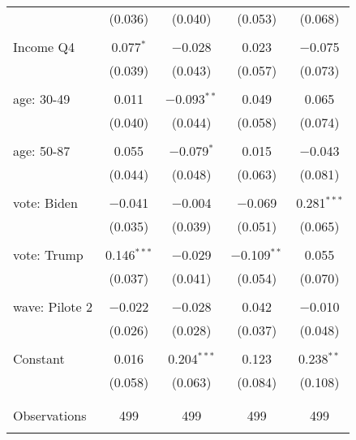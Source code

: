 \begin{tabular}{@{\extracolsep{5pt}}lcccc}
  & (0.036) & (0.040) & (0.053) & (0.068) \\ 
  & & & & \\ 
 Income Q4 & 0.077$^{*}$ & $-$0.028 & 0.023 & $-$0.075 \\ 
  & (0.039) & (0.043) & (0.057) & (0.073) \\ 
  & & & & \\ 
 age: 30-49 & 0.011 & $-$0.093$^{**}$ & 0.049 & 0.065 \\ 
  & (0.040) & (0.044) & (0.058) & (0.074) \\ 
  & & & & \\ 
 age: 50-87 & 0.055 & $-$0.079$^{*}$ & 0.015 & $-$0.043 \\ 
  & (0.044) & (0.048) & (0.063) & (0.081) \\ 
  & & & & \\ 
 vote: Biden & $-$0.041 & $-$0.004 & $-$0.069 & 0.281$^{***}$ \\ 
  & (0.035) & (0.039) & (0.051) & (0.065) \\ 
  & & & & \\ 
 vote: Trump & 0.146$^{***}$ & $-$0.029 & $-$0.109$^{**}$ & 0.055 \\ 
  & (0.037) & (0.041) & (0.054) & (0.070) \\ 
  & & & & \\ 
 wave: Pilote 2 & $-$0.022 & $-$0.028 & 0.042 & $-$0.010 \\ 
  & (0.026) & (0.028) & (0.037) & (0.048) \\ 
  & & & & \\ 
 Constant & 0.016 & 0.204$^{***}$ & 0.123 & 0.238$^{**}$ \\ 
  & (0.058) & (0.063) & (0.084) & (0.108) \\ 
  & & & & \\ 
\hline \\[-1.8ex] 

Observations & 499 & 499 & 499 & 499 \\ 
\hline 
\hline \\[-1.8ex] 
\end{tabular} 